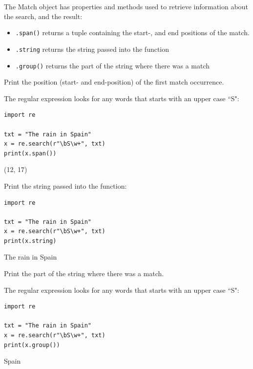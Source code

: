 \documentclass[12pt,a4paper]{article}
\newcommand{\code}[1]{%
	\colorbox{backcolour}{\lstinline{#1}}%
}
\begin{document}
The Match object has properties and methods used to retrieve information about
the search, and the result:

\begin{itemize}
	\item \code{.span()} returns a tuple containing the start-, and end positions of the match.
	\item \code{.string} returns the string passed into the function
	\item \code{.group()} returns the part of the string where there was a match
\end{itemize}

\begin{ebox}
Print the position (start- and end-position) of the first match occurrence.

The regular expression looks for any words that starts with an upper case ``S":
	\begin{lstlisting}
import re

txt = "The rain in Spain"
x = re.search(r"\bS\w+", txt)
print(x.span())
	\end{lstlisting}
\tcblower
	\begin{vercode}
(12, 17)
	\end{vercode}
\end{ebox}

\begin{ebox}
Print the string passed into the function:
	\begin{lstlisting}
import re

txt = "The rain in Spain"
x = re.search(r"\bS\w+", txt)
print(x.string)
	\end{lstlisting}
\tcblower
	\begin{vercode}
The rain in Spain
	\end{vercode}
\end{ebox}

\begin{ebox}
Print the part of the string where there was a match.

The regular expression looks for any words that starts with an upper case ``S":
	\begin{lstlisting}
import re

txt = "The rain in Spain"
x = re.search(r"\bS\w+", txt)
print(x.group()) 
	\end{lstlisting}
\tcblower
	\begin{vercode}
Spain
	\end{vercode}
\end{ebox}
\end{document}
